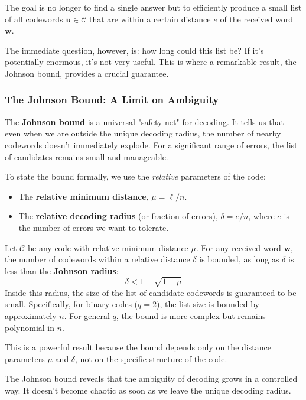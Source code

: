 \documentclass{article}
\begin{document}
The goal is no longer to find a single answer but to efficiently produce a small list of all codewords $\mathbf{u} \in \mathcal{C}$ that are within a certain distance $e$ of the received word $\mathbf{w}$.

The immediate question, however, is: how long could this list be? If it's potentially enormous, it's not very useful. This is where a remarkable result, the Johnson bound, provides a crucial guarantee.

\subsubsection{The Johnson Bound: A Limit on Ambiguity}
The \textbf{Johnson bound} is a universal "safety net" for decoding. It tells us that even when we are outside the unique decoding radius, the number of nearby codewords doesn't immediately explode. For a significant range of errors, the list of candidates remains small and manageable.

To state the bound formally, we use the \textit{relative} parameters of the code:
\begin{itemize}
    \item The \textbf{relative minimum distance}, $\mu = \ell / n$.
    \item The \textbf{relative decoding radius} (or fraction of errors), $\delta = e / n$, where $e$ is the number of errors we want to tolerate.
\end{itemize}

\begin{tcolorbox}[breakable, title={The Johnson Bound}]
Let $\mathcal{C}$ be any code with relative minimum distance $\mu$. For any received word $\mathbf{w}$, the number of codewords within a relative distance $\delta$ is bounded, as long as $\delta$ is less than the \textbf{Johnson radius}:
\[
\delta < 1 - \sqrt{1-\mu}
\]
Inside this radius, the size of the list of candidate codewords is guaranteed to be small. Specifically, for binary codes ($q=2$), the list size is bounded by approximately $n$. For general $q$, the bound is more complex but remains polynomial in $n$.

This is a powerful result because the bound depends only on the distance parameters $\mu$ and $\delta$, not on the specific structure of the code.
\end{tcolorbox}

The Johnson bound reveals that the ambiguity of decoding grows in a controlled way. It doesn't become chaotic as soon as we leave the unique decoding radius.
\end{document}

